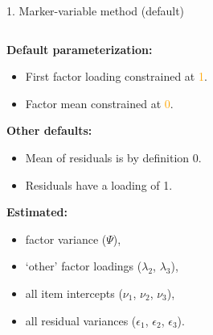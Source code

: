 \documentclass[10pt]{beamer}\usepackage[]{graphicx}\usepackage[]{xcolor}
\begin{document}
\begin{frame}{1. Marker-variable method (default)}

    \begin{columns}[T] %
    \begin{column}{.65\textwidth}

        \textbf{Default parameterization:}
        \begin{itemize}
            \item First factor loading constrained at \textcolor{orange}{1}.
            \item Factor mean constrained at \textcolor{orange}{0}.
        \end{itemize} 
        \textbf{Other defaults:}
        \begin{itemize}
            \item Mean of residuals is by definition 0.
            \item Residuals have a loading of 1.
        \end{itemize} 
        \textbf{Estimated:}
        \begin{itemize}
            \item factor variance ($\Psi$), 
            \item `other' factor loadings ($\lambda_2$, $\lambda_3$),
            \item all item intercepts ($\nu_1$, $\nu_2$, $\nu_3$), 
            \item all residual variances ($\epsilon_1$, $\epsilon_2$, $\epsilon_3$).
        \end{itemize}

    \end{column}%
    
    \hfill%
    \begin{column}{.34\textwidth}


\end{column}
\end{columns}
\end{frame}
\end{document}
